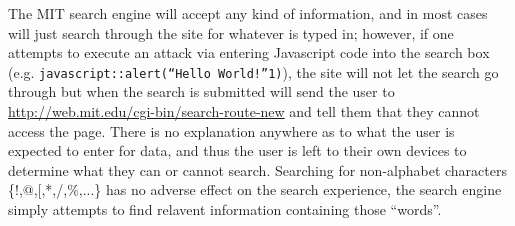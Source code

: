             The MIT search engine will accept any kind of information, and in most cases will just
            search through the site for whatever is typed in; however, if one attempts to execute an
            attack via entering Javascript code into the search box (e.g. \texttt{javascript::alert(``Hello World!''1)}),
            the site will not let the search go through but when the search is submitted will send
            the user to \url{http://web.mit.edu/cgi-bin/search-route-new} and tell them that they
            cannot access the page. There is no explanation anywhere as to what the user is expected to
            enter for data, and thus the user is left to their own devices to determine what they can or
            cannot search. Searching for non-alphabet characters \{!,@,[,*,/,\%,...\} has no adverse effect on
            the search experience, the search engine simply attempts to find relavent information containing
            those ``words''.
			
